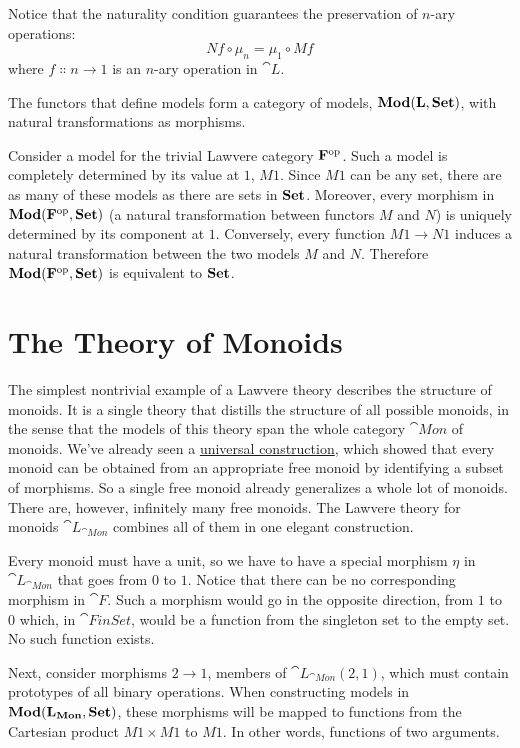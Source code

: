 Notice that the naturality condition guarantees the preservation of
$n$-ary operations:
\[N f \circ \mu_n = \mu_1 \circ M f\]
where $f \Colon n \to 1$ is an $n$-ary operation in
$\cat{L}$.

The functors that define models form a category of models,
$\mathbf{Mod}(\mathbf{L}, \mathbf{Set})$, with natural transformations as morphisms.

Consider a model for the trivial Lawvere category
$\mathbf{F}^{\mathrm{op}}$. Such a model is completely determined by
its value at $1$, $M 1$. Since $M 1$ can be any
set, there are as many of these models as there are sets in
$\mathbf{Set}$. Moreover, every morphism in $\mathbf{Mod}(\mathbf{F}^{\mathrm{op}}, \mathbf{Set})$ (a
natural transformation between functors $M$ and $N$) is
uniquely determined by its component at $1$. Conversely, every
function $M 1 \to N 1$ induces a natural
transformation between the two models $M$ and $N$.
Therefore $\mathbf{Mod}(\mathbf{F}^{\mathrm{op}}, \mathbf{Set})$ is equivalent to $\mathbf{Set}$.

\section{The Theory of Monoids}

The simplest nontrivial example of a Lawvere theory describes the
structure of monoids. It is a single theory that distills the structure
of all possible monoids, in the sense that the models of this theory
span the whole category $\cat{Mon}$ of monoids. We've already seen a
\hyperref[free-monoids]{universal
	construction}, which showed that every monoid can be obtained from an
appropriate free monoid by identifying a subset of morphisms. So a
single free monoid already generalizes a whole lot of monoids. There
are, however, infinitely many free monoids. The Lawvere theory for
monoids $\cat{L}_{\cat{Mon}}$ combines all of them in one
elegant construction.

Every monoid must have a unit, so we have to have a special morphism
$\eta$ in $\cat{L}_{\cat{Mon}}$ that goes from $0$ to
$1$. Notice that there can be no corresponding morphism in
$\cat{F}$. Such a morphism would go in the opposite direction, from
$1$ to $0$ which, in $\cat{FinSet}$, would be a function
from the singleton set to the empty set. No such function exists.

Next, consider morphisms $2 \to 1$, members of
$\cat{L}_{\cat{Mon}}(2, 1)$, which must contain prototypes of all binary
operations. When constructing models in $\mathbf{Mod}(\mathbf{L}_{\mathbf{Mon}}, \mathbf{Set})$, these
morphisms will be mapped to functions from the Cartesian product
$M 1 \times M 1$ to $M 1$. In other words, functions of
two arguments.


